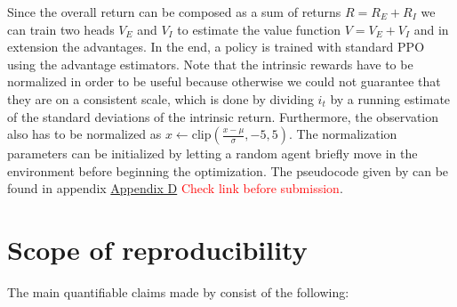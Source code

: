 \documentclass[10pt]{article} %
\begin{document}
\noindent Since the overall return can be composed as a sum of returns $R = R_{E} + R_{I}$ we can train two heads $V_{E}$ and $V_{I}$ to estimate the value function $V = V_{E} + V_{I}$ and in extension the advantages. In the end, a policy is trained with standard PPO using the advantage estimators. Note that the intrinsic rewards have to be normalized in order to be useful because otherwise we could not guarantee that they are on a consistent scale, which is done by dividing $i_{t}$ by a running estimate of the standard deviations of the intrinsic return. Furthermore, the observation also has to be normalized as $x \leftarrow \text{clip}(\frac{x - \mu}{\sigma}, -5, 5)$. The normalization parameters can be initialized by letting a random agent briefly move in the environment before beginning the optimization. The pseudocode given by \cite{rnd-paper} can be found in appendix \hyperlink{algo-rnd}{Appendix D} \textcolor{red}{Check link before submission}.

\section{Scope of reproducibility}
\label{sec:claims}

\noindent The main quantifiable claims made by \cite{rle-paper} consist of the following:
\end{document}

